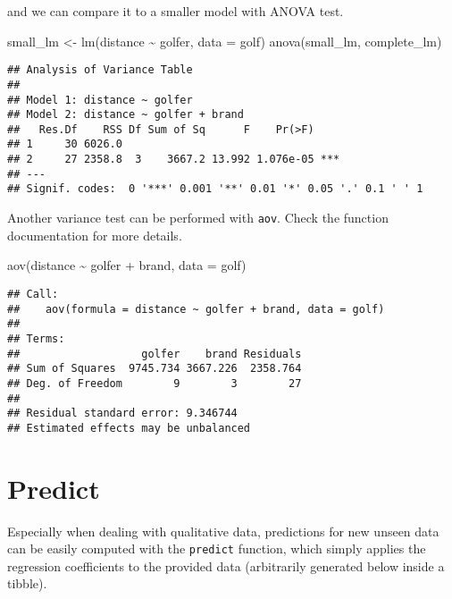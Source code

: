 \documentclass[
  oneside]{book}
\newenvironment{Shaded}{\begin{snugshade}}{\end{snugshade}}
\newcommand{\AttributeTok}[1]{\textcolor[rgb]{0.77,0.63,0.00}{#1}}
\newcommand{\FunctionTok}[1]{\textcolor[rgb]{0.00,0.00,0.00}{#1}}
\newcommand{\NormalTok}[1]{#1}
\newcommand{\OtherTok}[1]{\textcolor[rgb]{0.56,0.35,0.01}{#1}}
\newcommand{\SpecialCharTok}[1]{\textcolor[rgb]{0.00,0.00,0.00}{#1}}
\begin{document}
and we can compare it to a smaller model with ANOVA test.

\begin{Shaded}
\begin{Highlighting}[]
\NormalTok{small\_lm }\OtherTok{\textless{}{-}} \FunctionTok{lm}\NormalTok{(distance }\SpecialCharTok{\textasciitilde{}}\NormalTok{ golfer, }\AttributeTok{data =}\NormalTok{ golf)}
\FunctionTok{anova}\NormalTok{(small\_lm, complete\_lm)}
\end{Highlighting}
\end{Shaded}

\begin{verbatim}
## Analysis of Variance Table
## 
## Model 1: distance ~ golfer
## Model 2: distance ~ golfer + brand
##   Res.Df    RSS Df Sum of Sq      F    Pr(>F)    
## 1     30 6026.0                                  
## 2     27 2358.8  3    3667.2 13.992 1.076e-05 ***
## ---
## Signif. codes:  0 '***' 0.001 '**' 0.01 '*' 0.05 '.' 0.1 ' ' 1
\end{verbatim}

Another variance test can be performed with \texttt{aov}.
Check the function documentation for more details.

\begin{Shaded}
\begin{Highlighting}[]
\FunctionTok{aov}\NormalTok{(distance }\SpecialCharTok{\textasciitilde{}}\NormalTok{ golfer }\SpecialCharTok{+}\NormalTok{ brand, }\AttributeTok{data =}\NormalTok{ golf)}
\end{Highlighting}
\end{Shaded}

\begin{verbatim}
## Call:
##    aov(formula = distance ~ golfer + brand, data = golf)
## 
## Terms:
##                   golfer    brand Residuals
## Sum of Squares  9745.734 3667.226  2358.764
## Deg. of Freedom        9        3        27
## 
## Residual standard error: 9.346744
## Estimated effects may be unbalanced
\end{verbatim}

\hypertarget{predict}{%
\section{Predict}\label{predict}}

Especially when dealing with qualitative data, predictions for
new unseen data can be easily computed with the \texttt{predict} function,
which simply applies the regression coefficients to the provided data
(arbitrarily generated below inside a tibble).
\end{document}
